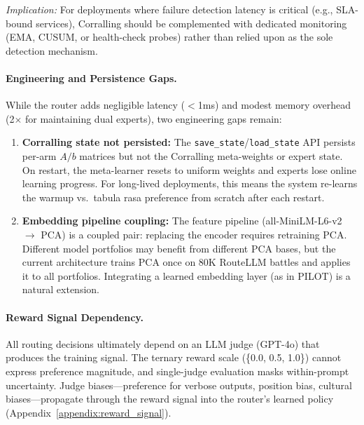\emph{Implication:}
For deployments where failure detection latency is critical (e.g., SLA-bound
services), Corralling should be complemented with dedicated monitoring
(EMA, CUSUM, or health-check probes) rather than relied upon as the sole
detection mechanism.

\paragraph{Engineering and Persistence Gaps.}
While the router adds negligible latency ($<$1ms) and modest memory overhead
(2$\times$ for maintaining dual experts), two engineering gaps remain:
\begin{enumerate}[nosep]
    \item \textbf{Corralling state not persisted:}
    The \texttt{save\_state}/\texttt{load\_state} API persists per-arm
    $A/b$ matrices but not the Corralling meta-weights or expert state.
    On restart, the meta-learner resets to uniform weights and experts lose
    online learning progress.
    For long-lived deployments, this means the system re-learns the warmup
    vs.\ tabula rasa preference from scratch after each restart.
    \item \textbf{Embedding pipeline coupling:}
    The feature pipeline (all-MiniLM-L6-v2 $\to$ PCA) is a coupled pair:
    replacing the encoder requires retraining PCA.
    Different model portfolios may benefit from different PCA bases, but the
    current architecture trains PCA once on 80K RouteLLM battles and applies
    it to all portfolios.
    Integrating a learned embedding layer (as in PILOT) is a natural
    extension.
\end{enumerate}

\paragraph{Reward Signal Dependency.}
All routing decisions ultimately depend on an LLM judge (GPT-4o) that
produces the training signal.
The ternary reward scale (\{0.0, 0.5, 1.0\}) cannot express preference
magnitude, and single-judge evaluation masks within-prompt uncertainty.
Judge biases---preference for verbose outputs, position bias, cultural
biases---propagate through the reward signal into the router's learned policy
(Appendix~\ref{appendix:reward_signal}).

